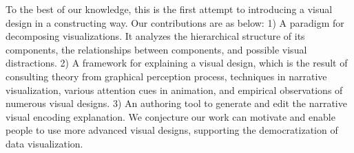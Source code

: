 To the best of our knowledge, this is the first attempt to introducing a visual design in a constructing way. Our contributions are as below: 1) A paradigm for decomposing visualizations. It analyzes the hierarchical structure of its components, the relationships between components, and possible visual distractions. 2) A framework for explaining a visual design, which is the result of consulting theory from graphical perception process, techniques in narrative visualization, various attention cues in animation, and empirical observations of numerous visual designs. 3) An authoring tool to generate and edit the narrative visual encoding explanation.
 We conjecture our work can motivate and enable people to use more advanced visual designs, supporting the democratization of data visualization.
 


